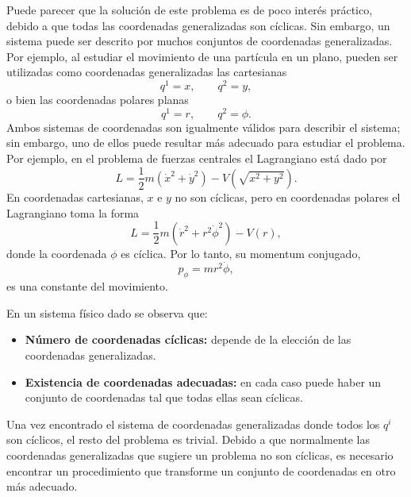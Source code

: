 \documentclass[../apunte_mecanica_clasica.tex]{subfiles}
\begin{document}
Puede parecer que la solución de este problema es de poco interés práctico, debido a que todas las coordenadas generalizadas son cíclicas. Sin embargo, un sistema puede ser descrito por muchos conjuntos de coordenadas generalizadas. Por ejemplo, al estudiar el movimiento de una partícula en un plano, pueden ser utilizadas como coordenadas generalizadas las cartesianas
\begin{equation}
    q^1=x,
    \qquad
    q^2=y,
    \label{eq:tc-cartesianas}
\end{equation}
o bien las coordenadas polares planas
\begin{equation}
    q^1=r,
    \qquad
    q^2=\phi.
    \label{eq:tc-polares}
\end{equation}
Ambos sistemas de coordenadas son igualmente válidos para describir el sistema; sin embargo, uno de ellos puede resultar más adecuado para estudiar el problema. Por ejemplo, en el problema de fuerzas centrales el Lagrangiano está dado por
\begin{equation}
    L=\frac{1}{2}m\left(\dot x^2+\dot y^2\right)-V\left(\sqrt{x^2+y^2}\right).
    \label{eq:tc-l-central-cartesiano}
\end{equation}
En coordenadas cartesianas, \(x\) e \(y\) no son cíclicas, pero en coordenadas polares el Lagrangiano toma la forma
\begin{equation}
    L=\frac{1}{2}m\left(\dot r^2+r^2\dot\phi^2\right)-V(r),
    \label{eq:tc-l-central-polar}
\end{equation}
donde la coordenada \(\phi\) es cíclica. Por lo tanto, su momentum conjugado,
\begin{equation}
    p_\phi=mr^2\dot\phi,
    \label{eq:tc-momentum-angular}
\end{equation}
es una constante del movimiento.

En un sistema físico dado se observa que:
\begin{itemize}
    \item \textbf{Número de coordenadas cíclicas:} depende de la elección de las coordenadas generalizadas.
    \item \textbf{Existencia de coordenadas adecuadas:} en cada caso puede haber un conjunto de coordenadas tal que todas ellas sean cíclicas.
\end{itemize}
Una vez encontrado el sistema de coordenadas generalizadas donde todos los \(q^i\) son cíclicos, el resto del problema es trivial. Debido a que normalmente las coordenadas generalizadas que sugiere un problema no son cíclicas, es necesario encontrar un procedimiento que transforme un conjunto de coordenadas en otro más adecuado.
\end{document}
